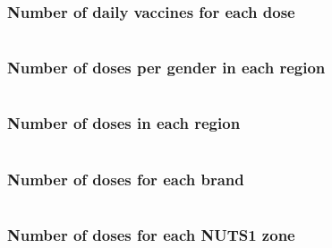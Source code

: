 \documentclass[12pt, a4paper]{article}
\begin{document}

\subsubsection{Number of daily vaccines for each dose}

\begin{tcolorbox}[fontupper=\scriptsize]
    \begin{verbatim}
    \end{verbatim}
\end{tcolorbox}

\noindent
\blindtext

\subsubsection{Number of doses per gender in each region}

\begin{tcolorbox}[fontupper=\scriptsize]
    \begin{verbatim}
    \end{verbatim}
\end{tcolorbox}

\noindent
\blindtext

\subsubsection{Number of doses in each region}

\begin{tcolorbox}[fontupper=\scriptsize]
    \begin{verbatim}
    \end{verbatim}
\end{tcolorbox}

\noindent
\blindtext

\subsubsection{Number of doses for each brand}

\begin{tcolorbox}[fontupper=\scriptsize]
    \begin{verbatim}
    \end{verbatim}
\end{tcolorbox}

\noindent
\blindtext

\subsubsection{Number of doses for each NUTS1 zone}
\end{document}
